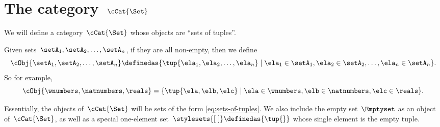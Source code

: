 
\section{The category~$\cCat{\Set}$}
\label{sec:cartcatset}

We will define a category~$\cCat{\Set}$ whose objects are ``sets of tuples''.

%
%
%

Given sets~$\setA_1, \setA_2, \dots , \setA_n$, if they are all non-empty, then we define
\begin{equation}
    \label{eq:sets-of-tuples}
    \cObj{\setA_1, \setA_2, \dots, \setA_n} \definedas \{ \tup{\ela_1, \ela_2, \dots, \ela_n} \mid \ela_1 \in \setA_1, \ela_2 \in \setA_2, \dots, \ela_n \in \setA_n \}.
\end{equation}
So for example,
\begin{equation*}
    \cObj{\wnumbers, \natnumbers, \reals} = \{ \tup{\ela, \elb, \elc} \mid \ela \in \wnumbers, \elb \in \natnumbers, \elc \in \reals \}.
\end{equation*}

Essentially, the objects of~$\cCat{\Set}$ will be sets of the form \cref{eq:sets-of-tuples}.
We also include the empty set~$\Emptyset$ as an object of~$\cCat{\Set}$, as well as a special one-element set~$\stylesets{[ \ ]} \definedas \{ \tup{} \}$ whose single element is the empty tuple.

